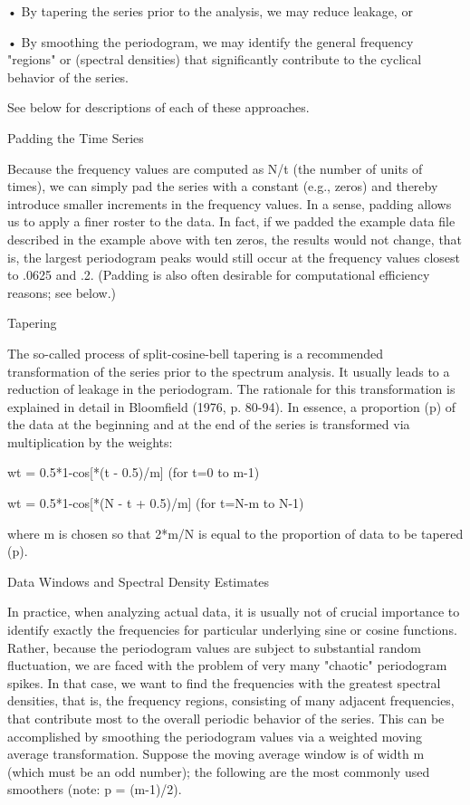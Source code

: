 •
By tapering the series prior to the analysis, we may reduce leakage, or

•
By smoothing the periodogram, we may identify the general frequency "regions" or (spectral densities) that significantly contribute to the cyclical behavior of the series.


See below for descriptions of each of these approaches.

Padding the Time Series

Because the frequency values are computed as N/t (the number of units of times), we can simply pad the series with a constant (e.g., zeros) and thereby introduce smaller increments in the frequency values. In a sense, padding allows us to apply a finer roster to the data. In fact, if we padded the example data file described in the example above with ten zeros, the results would not change, that is, the largest periodogram peaks would still occur at the frequency values closest to .0625 and .2. (Padding is also often desirable for computational efficiency reasons; see below.)

Tapering

The so-called process of split-cosine-bell tapering is a recommended transformation of the series prior to the spectrum analysis. It usually leads to a reduction of leakage in the periodogram. The rationale for this transformation is explained in detail in Bloomfield (1976, p. 80-94). In essence, a proportion (p) of the data at the beginning and at the end of the series is transformed via multiplication by the weights:

wt = 0.5*{1-cos[*(t - 0.5)/m]}     (for t=0 to m-1)

wt = 0.5*{1-cos[*(N - t + 0.5)/m]}     (for t=N-m to N-1)

where m is chosen so that 2*m/N is equal to the proportion of data to be tapered (p).

Data Windows and Spectral Density Estimates

In practice, when analyzing actual data, it is usually not of crucial importance to identify exactly the frequencies for particular underlying sine or cosine functions. Rather, because the periodogram values are subject to substantial random fluctuation, we are faced with the problem of very many "chaotic" periodogram spikes. In that case, we want to find the frequencies with the greatest spectral densities, that is, the frequency regions, consisting of many adjacent frequencies, that contribute most to the overall periodic behavior of the series. This can be accomplished by smoothing the periodogram values via a weighted moving average transformation. Suppose the moving average window is of width m (which must be an odd number); the following are the most commonly used smoothers (note: p = (m-1)/2).

